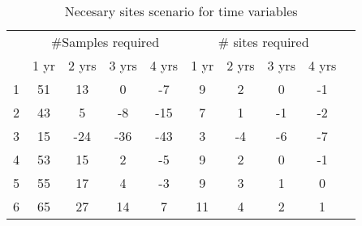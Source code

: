 \begin{table}[htbp]
\centering
\caption{Necesary sites scenario for time variables}
\begin{tabular}{ccccc|ccccc}
\toprule
\multicolumn{1}{c}{} &  \multicolumn{4}{c}{ \#Samples required} & \multicolumn{4}{c}{\# sites required} \\ \cline{2-9}\noalign{\smallskip}
\multicolumn{1}{p{3cm}}{Elevation Bands}  & 1 yr   & 2 yrs  & 3 yrs     & 4 yrs   & 1 yr  & 2 yrs & 3 yrs  & 4 yrs \\ \midrule
1 &  51 & 13 & 0 & -7 & 9 & 2 & 0 & -1 \\ 
2 &  43 & 5 & -8 & -15 & 7 & 1 & -1 & -2 \\ 
3 &  15 & -24 & -36 & -43 & 3 & -4 & -6 & -7 \\ 
4 &  53 & 15 & 2 & -5 & 9 & 2 & 0 & -1 \\ 
5 &  55 & 17 & 4 & -3 & 9 & 3 & 1 & 0 \\ 
6 &  65 & 27 & 14 & 7 & 11 & 4 & 2 & 1 \\ \bottomrule
\end{tabular}
\label{tab:TVapsenario}
\end{table}